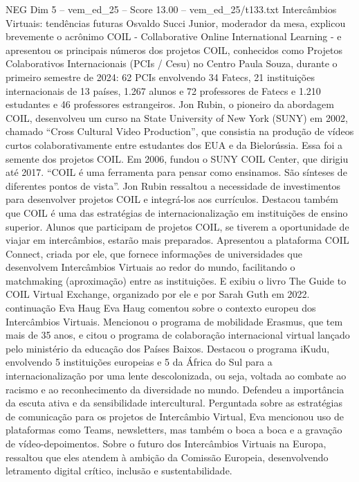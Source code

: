 \begin{textsample}{NEG Dim 5 – vem\_ed\_25 – Score 13.00 – vem\_ed\_25/t133.txt}  \label{ex:f5_neg_161}
Intercâmbios Virtuais: tendências futuras Osvaldo Succi Junior, moderador da mesa, explicou brevemente o acrônimo COIL - Collaborative Online International Learning - e apresentou os principais números dos projetos COIL, conhecidos como Projetos Colaborativos Internacionais (PCIs / Cesu) no Centro Paula Souza, durante o primeiro semestre de 2024: 62 PCIs envolvendo 34 Fatecs, 21 instituições internacionais de 13 países, 1.267 alunos e 72 professores de Fatecs e 1.210 estudantes e 46 professores estrangeiros.
Jon Rubin, o pioneiro da abordagem COIL, desenvolveu um curso na State University of New York (SUNY) em 2002, chamado “Cross Cultural Video Production”, que consistia na produção de vídeos curtos colaborativamente entre estudantes dos EUA e da Bielorússia.
Essa foi a semente dos projetos COIL.
Em 2006, fundou o SUNY COIL Center, que dirigiu até 2017. “COIL é uma ferramenta para pensar como ensinamos.
São sínteses de diferentes pontos de vista”.
Jon Rubin ressaltou a necessidade de investimentos para desenvolver projetos COIL e integrá-los aos currículos.
Destacou também que COIL é uma das estratégias de internacionalização em instituições de ensino superior.
Alunos que participam de projetos COIL, se tiverem a oportunidade de viajar em intercâmbios, estarão mais preparados.
Apresentou a plataforma COIL Connect, criada por ele, que fornece informações de universidades que desenvolvem Intercâmbios Virtuais ao redor do mundo, facilitando o matchmaking (aproximação) entre as instituições.
E exibiu o livro The Guide to COIL Virtual Exchange, organizado por ele e por Sarah Guth em 2022. continuação Eva Haug Eva Haug comentou sobre o contexto europeu dos Intercâmbios Virtuais.
Mencionou o programa de mobilidade Erasmus, que tem mais de 35 anos, e citou o programa de colaboração internacional virtual lançado pelo ministério da educação dos Países Baixos.
Destacou o programa iKudu, envolvendo 5 instituições europeias e 5 da África do Sul para a internacionalização por uma lente descolonizada, ou seja, voltada ao combate ao racismo e ao reconhecimento da diversidade no mundo.
Defendeu a importância da escuta ativa e da sensibilidade intercultural.
Perguntada sobre as estratégias de comunicação para os projetos de Intercâmbio Virtual, Eva mencionou uso de plataformas como Teams, newsletters, mas também o boca a boca e a gravação de vídeo-depoimentos.
Sobre o futuro dos Intercâmbios Virtuais na Europa, ressaltou que eles atendem à ambição da Comissão Europeia, desenvolvendo letramento digital crítico, inclusão e sustentabilidade.

\end{textsample}
